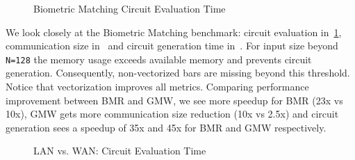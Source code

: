 

\begin{figure}[htbp]
\centering
\resizebox{0.7\columnwidth}{!}{}
\caption{Biometric Matching Circuit Evaluation Time}
\label{fig:graph_biometric_eval_time}
\end{figure}

\begin{comment}
\begin{figure}[htbp]
\centering
\resizebox{0.7\columnwidth}{!}{}
\caption{Biometric Matching Communication Size, x-axis lists database size}
\label{fig:graph_biometic_comm_size}
\end{figure}

\begin{figure}[htbp]
\centering
\resizebox{0.7\columnwidth}{!}{}
\caption{Biometric Matching Circuit Generation Time, x-axis lists database size}
\label{fig:graph_biometic_circ_gen_time}
\end{figure}
\end{comment}

We look closely at the Biometric Matching benchmark: circuit evaluation in~\cref{fig:graph_biometric_eval_time}, communication size in~\cite{Anon_TR} and circuit generation time in~\cite{Anon_TR}.
For input size beyond {\tt N=128} the memory usage exceeds available memory and prevents circuit generation. Consequently, non-vectorized bars are missing beyond this threshold. Notice that vectorization improves all metrics. %
Comparing performance improvement between BMR and GMW, we see more speedup for BMR (23x vs 10x), GMW gets more communication size reduction (10x vs 2.5x) and circuit generation sees a speedup of 35x and 45x for BMR and GMW respectively. 



\begin{figure}[htbp]
\centering
\resizebox{0.7\columnwidth}{!}{}
\caption{LAN vs. WAN: Circuit Evaluation Time}
\label{fig:graph_comparison_eval_time}
\end{figure}

